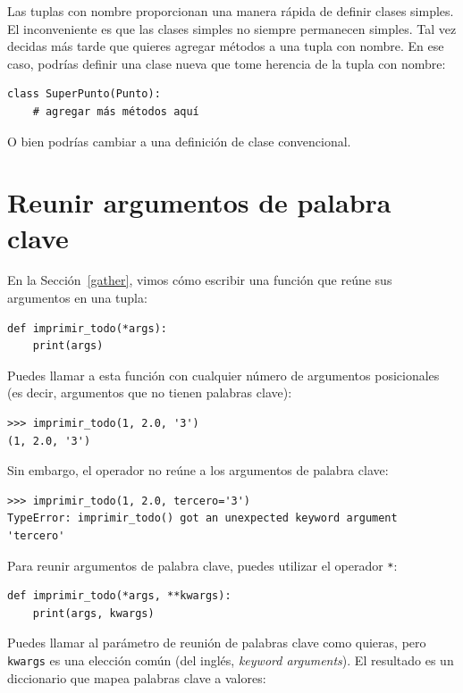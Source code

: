 \documentclass[10pt]{book}
\begin{document}
Las tuplas con nombre proporcionan una manera rápida de definir clases simples.
El inconveniente es que las clases simples no siempre permanecen simples.
Tal vez decidas más tarde que quieres agregar métodos a una tupla con nombre.
En ese caso, podrías definir una clase nueva que tome herencia de
la tupla con nombre:

\begin{verbatim}
class SuperPunto(Punto):
    # agregar más métodos aquí
\end{verbatim}

O bien podrías cambiar a una definición de clase convencional.


\section{Reunir argumentos de palabra clave}

En la Sección~\ref{gather}, vimos cómo escribir una función que
reúne sus argumentos en una tupla:

\begin{verbatim}
def imprimir_todo(*args):
    print(args)
\end{verbatim}
%
Puedes llamar a esta función con cualquier número de argumentos posicionales
(es decir, argumentos que no tienen palabras clave):

\begin{verbatim}
>>> imprimir_todo(1, 2.0, '3')
(1, 2.0, '3')
\end{verbatim}
%
Sin embargo, el operador {\tt *} no reúne a los argumentos de palabra clave:

\begin{verbatim}
>>> imprimir_todo(1, 2.0, tercero='3')
TypeError: imprimir_todo() got an unexpected keyword argument 'tercero'
\end{verbatim}
%
Para reunir argumentos de palabra clave, puedes utilizar el operador {\tt **}:

\begin{verbatim}
def imprimir_todo(*args, **kwargs):
    print(args, kwargs)
\end{verbatim}
%
Puedes llamar al parámetro de reunión de palabras clave como quieras, pero
{\tt kwargs} es una elección común (del inglés, {\em keyword arguments}).  El resultado es un diccionario que mapea
palabras clave a valores:
\end{document}
